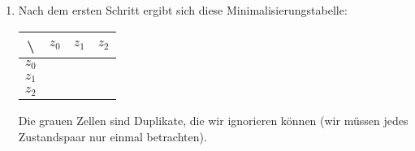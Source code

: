 \begin{enumerate}
    \item Nach dem ersten Schritt ergibt sich diese Minimalisierungstabelle: 
        \begin{table}[H]
            \centering
            \begin{tabular}{|c|c|c|c|}
            \hline
                \textbackslash  & $z_0$   & $z_1$               & $z_2$ \\ \hline
                $z_0$           &         & \cellcolor{gray}    & \cellcolor{gray} \\ \hline
                $z_1$           &         &                     & \cellcolor{gray} \\ \hline
                $z_2$           &         &                     & \\ \hline
            \end{tabular}
            \label{tab:mintab1}
        \end{table}
        Die grauen Zellen sind Duplikate,
        die wir ignorieren können (wir müssen jedes Zustandspaar nur einmal betrachten).


\end{enumerate}
